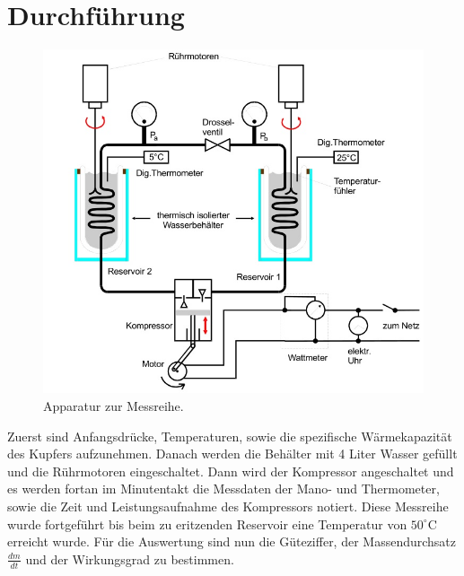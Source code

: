 \section{Durchführung}
\label{sec:Durchführung}
\begin{figure}
  \centering
  \includegraphics{data/Abb2.jpg}
  \caption{Apparatur zur Messreihe. \cite{AnleitungV206}}
  \label{fig:Abb2}
\end{figure}
Zuerst sind Anfangsdrücke, Temperaturen, sowie die spezifische Wärmekapazität des Kupfers aufzunehmen.
Danach werden die Behälter mit 4 Liter Wasser gefüllt und die Rührmotoren eingeschaltet.
Dann wird der Kompressor angeschaltet und es werden fortan im Minutentakt die Messdaten der Mano- und Thermometer, sowie die Zeit und Leistungsaufnahme des Kompressors notiert.
Diese Messreihe wurde fortgeführt bis beim zu eritzenden Reservoir eine Temperatur von $50^\circ\text{C}$ erreicht wurde.
Für die Auswertung sind nun die Güteziffer, der Massendurchsatz $\frac{dm}{dt}$ und der Wirkungsgrad zu bestimmen.
